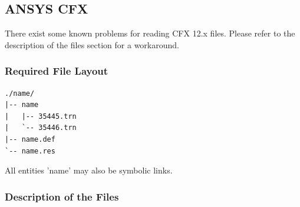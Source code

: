 \documentclass[a4paper,10pt]{article}
\begin{document}
\newpage
\subsection{ANSYS CFX}
\label{sec:cfx}

There exist some  known problems for reading CFX 12.x  files.  Please refer to
the description of the files section for a workaround.

\subsubsection{Required File Layout}
\begin{verbatim}
./name/
|-- name
|   |-- 35445.trn
|   `-- 35446.trn
|-- name.def
`-- name.res
\end{verbatim}

All entities 'name' may also be symbolic links.

\subsubsection{Description of the Files}
\end{document}
